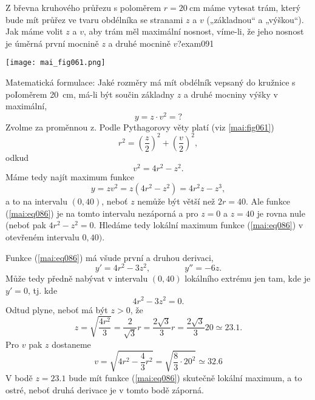 \begin{mathexam}{Z břevna kruhového průřezu s poloměrem \(r = \SI{20}{\cm}\) máme vytesat trám,
  který bude mít průřez ve tvaru obdélníka se stranami \(z\) a \(v\) („základnou“ a „výškou“). Jak
  máme volit \(z\) a \(v\), aby trám měl maximální nosnost, víme-li, že jeho nosnost je úměrná první
  mocnině \(z\) a druhé mocnině \(v\)?}{exam091}
   
  {\centering
    \captionsetup{type=figure}
    \texttt{[image: mai\_fig061.png]} 
    \label{mai:fig061}
  \par}
  
  Matematická formulace: Jaké rozměry má mít obdélník vepsaný do kružnice s poIoměrem \SI{20}{\cm},
  má-li být součin základny \(z\) a druhé mocniny výšky v maximální,
  \begin{equation*}
    y = z\cdot v^2 = ?
  \end{equation*}
  Zvolme za proměnnou z. Podle Pythagorovy věty platí (viz \ref{mai:fig061})
  \begin{equation*}
      r^2 = \left(\dfrac{z}{2}\right)^2 + \left(\dfrac{v}{2}\right)^2,
  \end{equation*}
  odkud 
  \begin{equation*}
      v^2 = 4r^2 - z^2.
  \end{equation*}
  Máme tedy najít maximum funkce
  \begin{equation}\label{mai:eq086}
      y = zv^2 = z(4r^2 - z^2) = 4r^2z - z^3,
  \end{equation}
  a to na intervalu \((0,40)\), neboť \(z\) nemůže být větší než \(2r = 40\). Ale funkce
  (\ref{mai:eq086}) je na tomto intervalu nezáporná a pro \(z = 0\) a \(z = 40\) je rovna nule
  (neboť pak \(4r^2 - z^2 = 0\). Hledáme tedy lokální maximum funkce (\ref{mai:eq086}) v otevřeném
  intervalu \(0,40)\). 

  Funkce (\ref{mai:eq086}) má všude první a druhou derivaci,
  \begin{equation*}
      y' = 4r^2 - 3z^2, \qquad\qquad y'' = -6z.
  \end{equation*}
  Může tedy předně nabývat v intervalu \((0, 40)\) lokálního extrému jen tam, kde je \(y'=0\), tj.
  kde
  \begin{equation*}
      4r^2 - 3z^2 = 0.
  \end{equation*}
  Odtud plyne, neboť má být \(z > 0\), že
  \begin{equation*}
      z = \sqrt{\dfrac{4r^2}{3}} = \dfrac{2}{\sqrt{3}}r = \dfrac{2\sqrt{3}}{3}r = 
          \dfrac{2\sqrt{3}}{3}20 \simeq \num{23.1}.
  \end{equation*}
  Pro \(v\) pak \(z\) dostaneme
  \begin{equation*}
      v = \sqrt{4r^2 - \dfrac{4}{3}r^2} = \sqrt{\frac{8}{3}\cdot20^2}\simeq\num{32.6}
  \end{equation*}
  V bodě \(z = \num{23.1}\) bude mít funkce (\ref{mai:eq086}) skutečně lokální maximum, a to ostré,
  neboť druhá derivace je v tomto bodě záporná.
\end{mathexam}